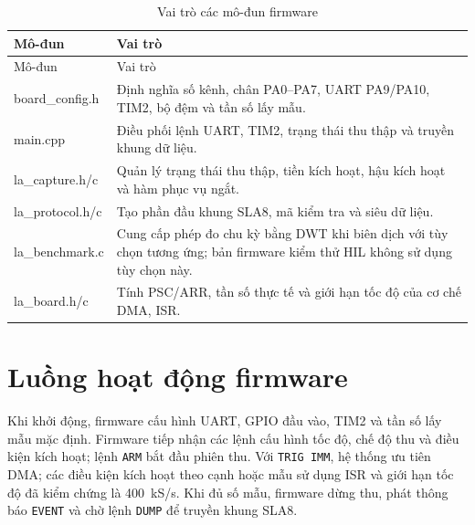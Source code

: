 \begin{longtable}[]{@{}|
  >{\raggedright\arraybackslash}p{}
  |>{\raggedright\arraybackslash}p{}|@{}}
\caption{Vai trò các mô-đun firmware}\tabularnewline
\hline
\begin{minipage}[b]{\linewidth}\raggedright
Mô-đun
\end{minipage} & \begin{minipage}[b]{\linewidth}\raggedright
Vai trò
\end{minipage} \\ \hline

\endfirsthead
\hline
\begin{minipage}[b]{\linewidth}\raggedright
Mô-đun
\end{minipage} & \begin{minipage}[b]{\linewidth}\raggedright
Vai trò
\end{minipage} \\ \hline

\endhead

\endlastfoot
board\_config.h & Định nghĩa số kênh, chân PA0--PA7, UART PA9/PA10, TIM2, bộ đệm và tần số lấy mẫu. \\ \hline
main.cpp & Điều phối lệnh UART, TIM2, trạng thái thu thập và truyền khung dữ liệu. \\ \hline
la\_capture.h/c & Quản lý trạng thái thu thập, tiền kích hoạt, hậu kích hoạt và hàm phục vụ ngắt. \\ \hline
la\_protocol.h/c & Tạo phần đầu khung SLA8, mã kiểm tra và siêu dữ liệu. \\ \hline
la\_benchmark.c & Cung cấp phép đo chu kỳ bằng DWT khi biên dịch với tùy chọn tương ứng; bản firmware kiểm thử HIL không sử dụng tùy chọn này. \\ \hline
la\_board.h/c & Tính PSC/ARR, tần số thực tế và giới hạn tốc độ của cơ chế DMA, ISR. \\ \hline
\end{longtable}

\section{Luồng hoạt động firmware}\label{sec:firmware-flow}

Khi khởi động, firmware cấu hình UART, GPIO đầu vào, TIM2 và tần số lấy mẫu mặc định. Firmware tiếp nhận các lệnh cấu hình tốc độ, chế độ thu và điều kiện kích hoạt; lệnh \texttt{ARM} bắt đầu phiên thu. Với \texttt{TRIG IMM}, hệ thống ưu tiên DMA; các điều kiện kích hoạt theo cạnh hoặc mẫu sử dụng ISR và giới hạn tốc độ đã kiểm chứng là 400~kS/s. Khi đủ số mẫu, firmware dừng thu, phát thông báo \texttt{EVENT} và chờ lệnh \texttt{DUMP} để truyền khung SLA8.

